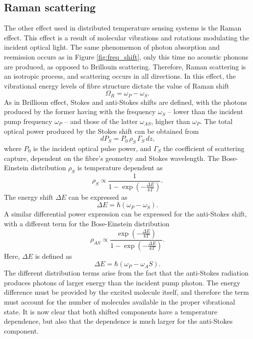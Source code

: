 \documentclass{standalone}
\begin{document}
\subsection{Raman scattering}
The other effect used in distributed temperature sensing systems is the Raman effect. This effect is a result of molecular vibrations and rotations modulating the incident optical light. The same phenomemon of photon absorption and reemission occurs as in Figure \ref{fig:freq_shift}, only this time no acoustic phonons are produced, as opposed to Brillouin scattering. Therefore, Raman scattering is an isotropic process, and scattering occurs in all directions. In this effect, the vibrational energy levels of fibre structure dictate the value of Raman shift
\begin{equation}
\Omega_R = \omega_P - \omega_S \textrm{.}
\end{equation}
As in Brillioun effect, Stokes and anti-Stokes shifts are defined, with the photons produced by the former having with the frequency $\omega_S$ -- lower than the incident pump frequency $\omega_P$ -- and those of the latter $\omega_{AS}$, higher than $\omega_P$. The total optical power produced by the Stokes shift can be obtained from 
\begin{equation}
dP_S = P_0 \, \rho_S \, \Gamma_S \, dz \textrm{,}
\end{equation}
where $P_0$ is the incident optical pulse power, and $\Gamma_S$ the coefficient of scattering capture, dependent on the fibre's geometry and Stokes wavelength. The Bose-Einstein distribution $\rho_S$ is temperature dependent as
\begin{equation} \label{eq:be-s}
\rho_S \propto \frac{1}{1- \exp\left( - \frac{\varDelta E}{k T} \right)} \textrm{.}
\end{equation}
The energy shift $\varDelta E$ can be expressed as
\begin{equation}
\varDelta E = \hbar \left( \omega_P - \omega_S \right) \textrm{.}
\end{equation}
A similar differential power expression can be expressed for the anti-Stokes shift, with a different term for the Bose-Einstein distribution
\begin{equation} \label{eq:be-as}
\rho_{AS} \propto \frac{\exp\left( - \frac{\varDelta E}{k T} \right)}{1 - \exp\left( - \frac{\varDelta E}{k T} \right)} \textrm{.}
\end{equation}
Here, $\varDelta E$ is defined as
\begin{equation}
\varDelta E = \hbar \left( \omega_P - \omega_AS \right) \textrm{.}
\end{equation}
The different distribution terms arise from the fact that the anti-Stokes radiation produces photons of larger energy than the incident pump photon. The energy difference must be provided by the excited molecule itself, and therefore the term must account for the number of molecules available in the proper vibrational state. It is now clear that both shifted components have a temperature dependence, but also that the dependence is much larger for the anti-Stokes component.











\setcounter{stranica}{\thepage}
\addtocounter{stranica}{1}
\end{document}
